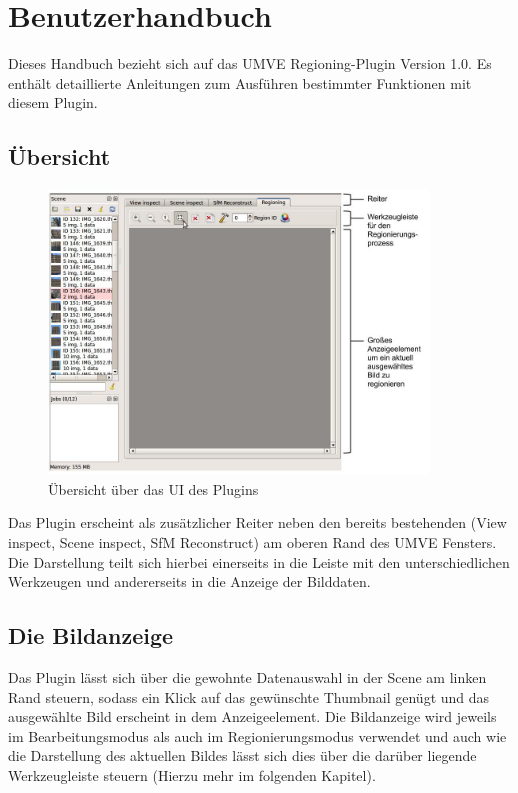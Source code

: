\chapter{Benutzerhandbuch}
Dieses Handbuch bezieht sich auf das UMVE Regioning-Plugin Version 1.0. Es enth\"alt detaillierte Anleitungen zum Ausf\"uhren bestimmter Funktionen mit diesem Plugin.

\section{\"Ubersicht}

\begin{figure}[h]
\centering
\includegraphics[width=0.9\textwidth]{gfx/Handbuch/RegioningPluginOverview.jpg}
\caption[\"Ubersicht \"uber das UI des Plugins]{\"Ubersicht \"uber das UI des Plugins}
\label{gr:uebersicht}
\end{figure}
\FloatBarrier

Das Plugin erscheint als zus\"atzlicher Reiter neben den bereits bestehenden (View inspect, Scene inspect, SfM Reconstruct) am oberen Rand des UMVE Fensters. Die Darstellung teilt sich hierbei einerseits in die Leiste mit den unterschiedlichen Werkzeugen und andererseits in die Anzeige der Bilddaten.

\section{Die Bildanzeige}
Das Plugin l\"asst sich \"uber die gewohnte Datenauswahl in der Scene am linken Rand steuern, sodass ein Klick auf das gew\"unschte Thumbnail gen\"ugt und das ausgew\"ahlte Bild erscheint in dem Anzeigeelement. Die Bildanzeige wird jeweils im Bearbeitungsmodus als auch im Regionierungsmodus verwendet und auch wie die Darstellung des aktuellen Bildes l\"asst sich dies \"uber die dar\"uber liegende Werkzeugleiste steuern (Hierzu mehr im folgenden Kapitel).

